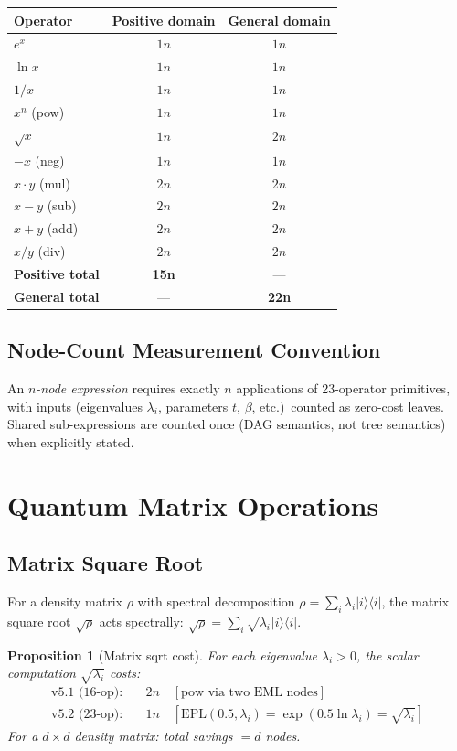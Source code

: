\documentclass[11pt]{article}
\newtheorem{proposition}[theorem]{Proposition}
\begin{document}
\begin{center}
\begin{tabular}{lcc}
\toprule
Operator & Positive domain & General domain \\
\midrule
$e^x$ & $1n$ & $1n$ \\
$\ln x$ & $1n$ & $1n$ \\
$1/x$ & $1n$ & $1n$ \\
$x^n$ (pow) & $1n$ & $1n$ \\
$\sqrt{x}$ & $1n$ & $2n$ \\
$-x$ (neg) & $1n$ & $1n$ \\
$x\cdot y$ (mul) & $2n$ & $2n$ \\
$x-y$ (sub) & $2n$ & $2n$ \\
$x+y$ (add) & $2n$ & $2n$ \\
$x/y$ (div) & $2n$ & $2n$ \\
\midrule
\textbf{Positive total} & \textbf{15n} & --- \\
\textbf{General total} & --- & \textbf{22n} \\
\bottomrule
\end{tabular}
\end{center}

\subsection{Node-Count Measurement Convention}

An \emph{$n$-node expression} requires exactly $n$ applications of 23-operator primitives,
with inputs (eigenvalues $\lambda_i$, parameters $t$, $\beta$, etc.)\ counted as zero-cost leaves.
Shared sub-expressions are counted once (DAG semantics, not tree semantics) when explicitly stated.

\section{Quantum Matrix Operations}

\subsection{Matrix Square Root}

For a density matrix $\rho$ with spectral decomposition $\rho=\sum_i \lambda_i |i\rangle\langle i|$,
the matrix square root $\sqrt{\rho}$ acts spectrally: $\sqrt{\rho}=\sum_i\sqrt{\lambda_i}|i\rangle\langle i|$.

\begin{proposition}[Matrix sqrt cost]
For each eigenvalue $\lambda_i>0$, the scalar computation $\sqrt{\lambda_i}$ costs:
\begin{align*}
\text{v5.1 (16-op):} &\quad 2n \quad [\text{pow via two EML nodes}] \\
\text{v5.2 (23-op):} &\quad 1n \quad [\mathrm{EPL}(0.5,\lambda_i)=\exp(0.5\ln\lambda_i)=\sqrt{\lambda_i}]
\end{align*}
For a $d\times d$ density matrix: total savings $= d$ nodes.
\end{proposition}
\end{document}
